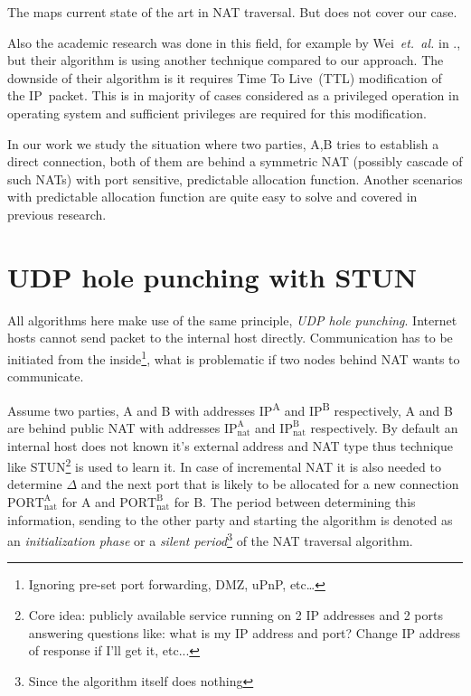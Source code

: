 \documentclass[twoside]{article}
\begin{document}
\begin{multicols}{2}
The \citep{rfc5128} maps current state of the art in NAT traversal. But does not cover our case.

Also the academic research was done in this field, for example by Wei~\emph{et.~al.} in \citep{wei}., but their algorithm is using another technique compared
to our approach. The downside of their algorithm is it requires Time To Live~(TTL) modification of the IP~packet. This is in majority of cases considered
as a privileged operation in operating system and sufficient privileges are required for this modification. 

In our work we study the situation where two parties, A,B tries to establish a direct connection, both of them are behind 
a symmetric NAT (possibly cascade of such NATs) with port sensitive, predictable allocation function. Another scenarios with
predictable allocation function are quite easy to solve and covered in previous research. 


\section{UDP hole punching with STUN}
All algorithms here make use of the same principle, \emph{UDP hole punching}. 
Internet hosts cannot send packet to the internal host directly. 
Communication has to be initiated from the inside\footnote{Ignoring 
pre-set port forwarding, DMZ, uPnP, etc\dots}, what is problematic if two nodes behind 
NAT wants to communicate.

Assume two parties, A and B with addresses IP\textsuperscript{A} and IP\textsuperscript{B} respectively,
A and B are behind public NAT with addresses $\text{IP}^{\text{A}}_{\text{nat}}$ and $\text{IP}^{\text{B}}_{\text{nat}}$
respectively. By default an internal host does not known it's external address and NAT type thus technique like 
STUN\footnote{Core idea: publicly available service running on 2 IP addresses and 2 ports 
answering questions like: what is my IP address and port? Change IP address of response if I'll get it, etc...} 
is used to learn it. In case of incremental NAT it is also needed to determine $\Delta$ and the next port
that is likely to be allocated for a new connection $\text{PORT}^{\text{A}}_{\text{nat}}$ for A and $\text{PORT}^{\text{B}}_{\text{nat}}$
for B. The period between determining this information, sending to the other party and starting the algorithm is
denoted as an \emph{initialization phase} or a \emph{silent period}\footnote{Since the algorithm itself does nothing} of the NAT traversal algorithm. 


\end{multicols}
\end{document}
